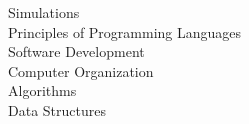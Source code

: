 \documentclass[letterpaper]{deedy-resume} %
\begin{document}
\begin{minipage}[t]{0.33\textwidth}
Simulations \\
Principles of Programming Languages \\
Software Development \\
Computer Organization \\
Algorithms \\
Data Structures \\

\sectionspace %



\end{minipage} %
\hfill
%
%
\end{document}
